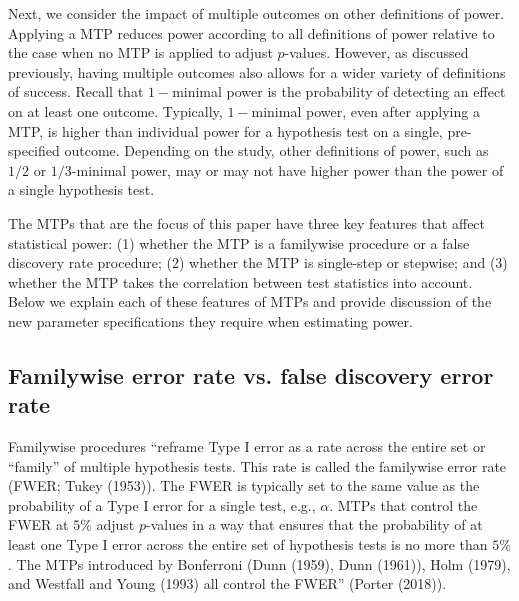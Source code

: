 \documentclass{article}
\begin{document}
Next, we consider the impact of multiple outcomes on other definitions
of power. Applying a MTP reduces power according to all definitions of
power relative to the case when no MTP is applied to adjust
\(p\)-values. However, as discussed previously, having multiple outcomes
also allows for a wider variety of definitions of success. Recall that
\(1-\)minimal power is the probability of detecting an effect on at
least one outcome. Typically, \(1-\)minimal power, even after applying a
MTP, is higher than individual power for a hypothesis test on a single,
pre-specified outcome. Depending on the study, other definitions of
power, such as \(1/2\) or \(1/3\)-minimal power, may or may not have
higher power than the power of a single hypothesis test.

The MTPs that are the focus of this paper have three key features that
affect statistical power: (1) whether the MTP is a familywise procedure
or a false discovery rate procedure; (2) whether the MTP is single-step
or stepwise; and (3) whether the MTP takes the correlation between test
statistics into account. Below we explain each of these features of MTPs
and provide discussion of the new parameter specifications they require
when estimating power.

\subsection{Familywise error rate vs. false discovery error rate}

Familywise procedures ``reframe Type I error as a rate across the entire
set or ``family'' of multiple hypothesis tests. This rate is called the
familywise error rate (FWER; Tukey (1953)). The FWER is typically set to
the same value as the probability of a Type I error for a single test,
e.g., \(\alpha\). MTPs that control the FWER at \(5\%\) adjust
\(p\)-values in a way that ensures that the probability of at least one
Type I error across the entire set of hypothesis tests is no more than
\(5\%\). The MTPs introduced by Bonferroni (Dunn (1959), Dunn (1961)),
Holm (1979), and Westfall and Young (1993) all control the FWER''
(Porter (2018)).
\end{document}
